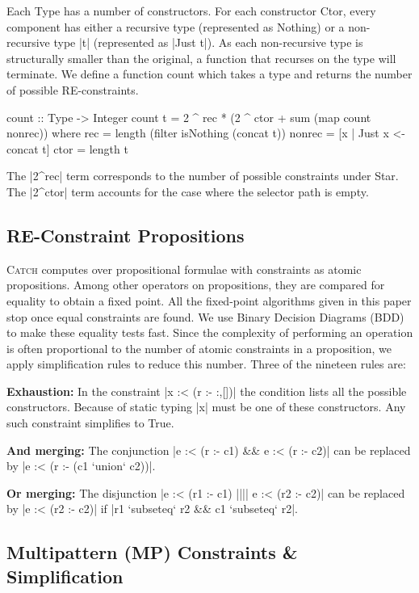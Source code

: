 \documentclass[preprint]{sigplanconf}
\newcommand{\C}[1]{\textsf{#1}}
\newcommand{\catch}{\textsc{Catch}}
\newcommand{\para}[1]{\vspace{2mm}\noindent\textbf{#1}}
\begin{document}
Each \C{Type} has a number of constructors. For each constructor \C{Ctor}, every component has either a recursive type (represented as \C{Nothing}) or a non-recursive type |t| (represented as |Just t|). As each non-recursive type is structurally smaller than the original, a function that recurses on the type will terminate. We define a function \C{count} which takes a type and returns the number of possible RE-constraints.

\begin{code}
count :: Type -> Integer
count t = 2 ^ rec * (2 ^ ctor + sum (map count nonrec))
    where
    rec = length (filter isNothing (concat t))
    nonrec = [x | Just x <- concat t]
    ctor = length t
\end{code}

The |2^rec| term corresponds to the number of possible constraints under \C{Star}. The |2^ctor| term accounts for the case where the selector path is empty.


\subsection{RE-Constraint Propositions}
\label{sec:re-propositions}

\catch{} computes over propositional formulae with constraints as atomic propositions. Among other operators on propositions, they are compared for equality to obtain a fixed point. All the fixed-point algorithms given in this paper stop once equal constraints are found. We use Binary Decision Diagrams (BDD) \citep{lee:bdd} to make these equality tests fast. Since the complexity of performing an operation is often proportional to the number of atomic constraints in a proposition, we apply simplification rules to reduce this number. Three of the nineteen rules are:

\para{Exhaustion:} In the constraint |x :< (r :- {:,[]})| the condition lists all the possible constructors. Because of static typing |x| must be one of these constructors. Any such constraint simplifies to True.

\para{And merging:} The conjunction |e :< (r :- c1) && e :< (r :- c2)| can be replaced by |e :< (r :- (c1 `union` c2))|.

\para{Or merging:} The disjunction |e :< (r1 :- c1) |||| e :< (r2 :- c2)| can be replaced by |e :< (r2 :- c2)| if |r1 `subseteq` r2 && c1 `subseteq` r2|.


\subsection{Multipattern (MP) Constraints \& Simplification}
\label{sec:multipattern}
\end{document}
